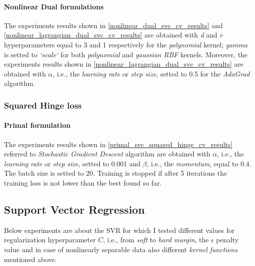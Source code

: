 \paragraph{Nonlinear Dual formulations}

The experiments results shown in \ref{nonlinear_dual_svc_cv_results} and \ref{nonlinear_lagrangian_dual_svc_cv_results} are obtained with \emph{d} and \emph{r} hyperparameters equal to 3 and 1 respectively for the \emph{polynomial} kernel; \emph{gamma} is setted to \emph{`scale`} for both \emph{polynomial} and \emph{gaussian RBF} kernels. Moreover, the experiments results shown in \ref{nonlinear_lagrangian_dual_svc_cv_results} are obtained with $\alpha$, i.e., the \emph{learning rate} or \emph{step size}, setted to 0.5 for the \emph{AdaGrad} algorithm.






\subsubsection{Squared Hinge loss}

\paragraph{Primal formulation}

The experiments results shown in \ref{primal_svc_squared_hinge_cv_results} referred to \emph{Stochastic Gradient Descent} algorithm are obtained with $\alpha$, i.e., the \emph{learning rate} or \emph{step size}, setted to 0.001 and $\beta$, i.e., the \emph{momentum}, equal to 0.4. The batch size is setted to 20. Training is stopped if after 5 iterations the training loss is not lower than the best found so far.



\pagebreak

\subsection{Support Vector Regression}

Below experiments are about the SVR for which I tested different values for regularization hyperparameter $C$, i.e., from \emph{soft} to \emph{hard margin}, the $\epsilon$ penalty value and in case of nonlinearly separable data also different \emph{kernel functions} mentioned above.

